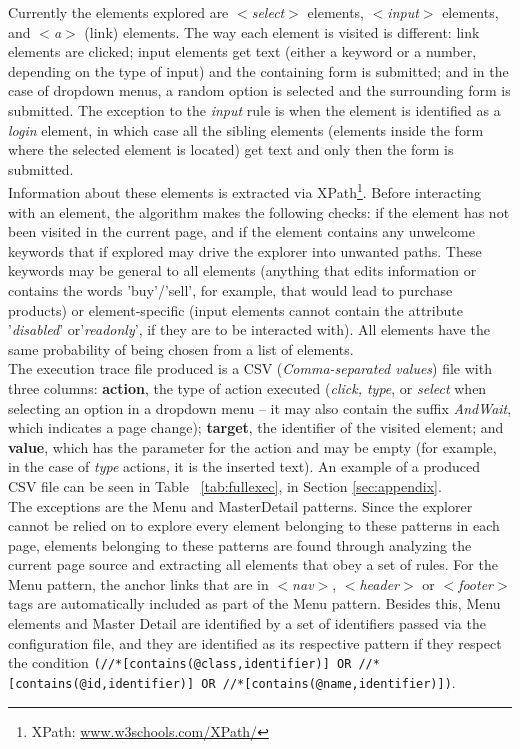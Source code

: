 Currently the elements explored are \textit{$<$select$>$} elements, \textit{$<$input$>$} elements, and \textit{$<$a$>$} (link) elements. The way each element is visited is different: link elements are clicked; input elements get text (either a keyword or a number, depending on the type of input) and the containing form is submitted; and in the case of dropdown menus, a random option is selected and the surrounding form is submitted. The exception to the \textit{input} rule is when the element is identified as a \textit{login} element, in which case all the sibling elements (elements inside the form where the selected element is located) get text and only then the form is submitted.\\

Information about these elements is extracted via XPath\footnote{XPath: \url{www.w3schools.com/XPath/}}. Before interacting with an element, the algorithm makes the following checks: if the element has not been visited in the current page, and if the element contains any unwelcome keywords that if explored may drive the explorer into unwanted paths. These keywords may be general to all elements (anything that edits information or contains the words 'buy'/'sell', for example, that would lead to purchase products) or element-specific (input elements cannot contain the attribute '\textit{disabled}' or'\textit{readonly}', if they are to be interacted with). All elements have the same probability of being chosen from a list of elements.\\

The execution trace file produced is a CSV (\textit{Comma-separated values}) file with three columns: \textbf{action}, the type of action executed (\textit{click, type}, or \textit{select} when selecting an option in a dropdown menu -- it may also contain the suffix \textit{AndWait}, which indicates a page change); \textbf{target}, the identifier of the visited element; and \textbf{value}, which has the parameter for the action and may be empty (for example, in the case of \textit{type} actions, it is the inserted text). An example of a produced CSV file can be seen in Table ~\ref{tab:fullexec}, in Section \ref{sec:appendix}.\\

The exceptions are the Menu and MasterDetail patterns. Since the explorer cannot be relied on to explore every element belonging to these patterns in each page, elements belonging to these patterns are found through analyzing the current page source and extracting all elements that obey a set of rules. For the Menu pattern, the anchor links that are in \textit{$<$nav$>$}, \textit{$<$header$>$} or \textit{$<$footer$>$} tags are automatically included as part of the Menu pattern. Besides this, Menu elements and Master Detail are identified by a set of identifiers passed via the configuration file, and they are identified as its respective pattern if they respect the condition \texttt{(//*[contains(@class,identifier)] OR //*[contains(@id,identifier)] OR //*[contains(@name,identifier)])}.\\

